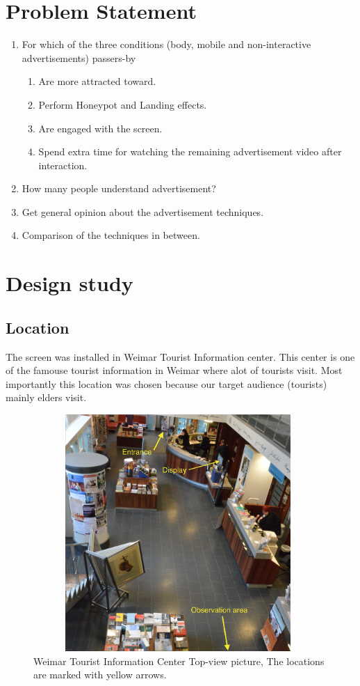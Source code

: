 \section{Problem Statement}
\begin{enumerate}

\item	For which of the three conditions (body, mobile and non-interactive advertisements) passers-by 

\begin{enumerate}
\item	Are more attracted toward.
\item	Perform Honeypot and Landing effects.
\item	Are engaged with the screen.
\item	Spend extra time for watching the remaining advertisement video after interaction.
\end{enumerate}

\item	How many people understand advertisement?
\item	Get general opinion about the advertisement techniques.
\item	Comparison of the techniques in between.

\end{enumerate}




\section{Design study}


\subsection{Location}
The screen was installed in Weimar Tourist Information center. This center is one of the famouse tourist information in Weimar where alot of tourists visit. Most importantly this location was chosen because our target audience (tourists) mainly elders visit.

\begin{figure}[H]
    \centering
    \includegraphics[width=110mm,height=90mm]{Figures/8/tourist_info}%
    \caption{Weimar Tourist Information Center Top-view picture, The locations are marked with yellow arrows.}%
    \label{fig:Tourist_info_center}%
\end{figure}


